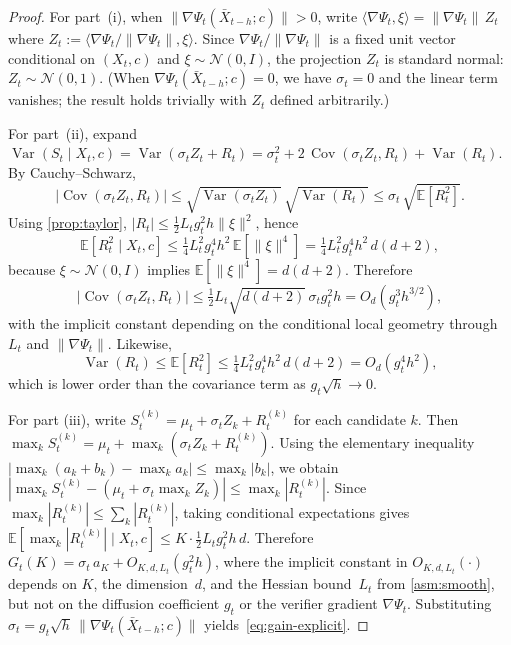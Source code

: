 \begin{proof}
For part~(i), when $\|\nabla\Psi_t(\bar{X}_{t-h}; c)\| > 0$, write
$\langle \nabla\Psi_t, \xi \rangle
= \|\nabla\Psi_t\|\,Z_t$
where $Z_t := \langle \nabla\Psi_t / \|\nabla\Psi_t\|, \xi \rangle$.
Since $\nabla\Psi_t / \|\nabla\Psi_t\|$ is a fixed unit vector conditional on
$(X_t, c)$ and $\xi \sim \mathcal{N}(0, I)$, the projection $Z_t$ is standard
normal: $Z_t \sim \mathcal{N}(0,1)$.
(When $\nabla\Psi_t(\bar{X}_{t-h}; c) = 0$, we have $\sigma_t = 0$ and the
linear term vanishes; the result holds trivially with $Z_t$ defined
arbitrarily.)

For part~(ii), expand
$\operatorname{Var}(S_t \mid X_t, c)
= \operatorname{Var}(\sigma_t Z_t + R_t)
= \sigma_t^2 + 2\,\operatorname{Cov}(\sigma_t Z_t, R_t) + \operatorname{Var}(R_t)$.
By Cauchy--Schwarz,
\[
  |\operatorname{Cov}(\sigma_t Z_t, R_t)|
  \le \sqrt{\operatorname{Var}(\sigma_t Z_t)}\,
      \sqrt{\operatorname{Var}(R_t)}
  \le \sigma_t\,\sqrt{\mathbb{E}[R_t^2]}.
\]
Using \cref{prop:taylor},
$|R_t| \le \tfrac{1}{2}L_t g_t^2 h \|\xi\|^2$, hence
\[
  \mathbb{E}[R_t^2 \mid X_t, c]
  \le \tfrac{1}{4}L_t^2 g_t^4 h^2\,\mathbb{E}[\|\xi\|^4]
  = \tfrac{1}{4}L_t^2 g_t^4 h^2\,d(d+2),
\]
because $\xi\sim\mathcal{N}(0,I)$ implies
$\mathbb{E}[\|\xi\|^4]=d(d+2)$.
Therefore
\[
  |\operatorname{Cov}(\sigma_t Z_t, R_t)|
  \le \tfrac{1}{2}L_t\sqrt{d(d+2)}\,\sigma_t g_t^2 h
  = O_d(g_t^3 h^{3/2}),
\]
with the implicit constant depending on the conditional local geometry
through $L_t$ and $\|\nabla\Psi_t\|$.
Likewise,
\[
  \operatorname{Var}(R_t)
  \le \mathbb{E}[R_t^2]
  \le \tfrac{1}{4}L_t^2 g_t^4 h^2\,d(d+2)
  = O_d(g_t^4 h^2),
\]
which is lower order than the covariance term as $g_t\sqrt{h}\to 0$.

For part (iii), write
$S_t^{(k)} = \mu_t + \sigma_t Z_k + R_t^{(k)}$
for each candidate $k$.
Then
$\max_k S_t^{(k)} = \mu_t + \max_k (\sigma_t Z_k + R_t^{(k)})$.
Using the elementary inequality
$|\max_k (a_k + b_k) - \max_k a_k| \le \max_k |b_k|$,
we obtain
$|\max_k S_t^{(k)} - (\mu_t + \sigma_t \max_k Z_k)|
\le \max_k |R_t^{(k)}|$.
Since $\max_k |R_t^{(k)}| \le \sum_k |R_t^{(k)}|$,
taking conditional expectations gives
$\mathbb{E}[\max_k |R_t^{(k)}| \mid X_t, c]
\le K \cdot \tfrac{1}{2} L_t g_t^2 h\,d$.
Therefore
$G_t(K) = \sigma_t\,a_K + O_{K,d,L_t}(g_t^2 h)$,
where the implicit constant in $O_{K,d,L_t}(\cdot)$ depends on $K$, the
dimension~$d$, and the Hessian bound~$L_t$ from \cref{asm:smooth}, but not
on the diffusion coefficient $g_t$ or the verifier gradient
$\nabla\Psi_t$.
Substituting $\sigma_t = g_t\sqrt{h}\,\|\nabla\Psi_t(\bar{X}_{t-h}; c)\|$
yields~\eqref{eq:gain-explicit}.
\end{proof}

